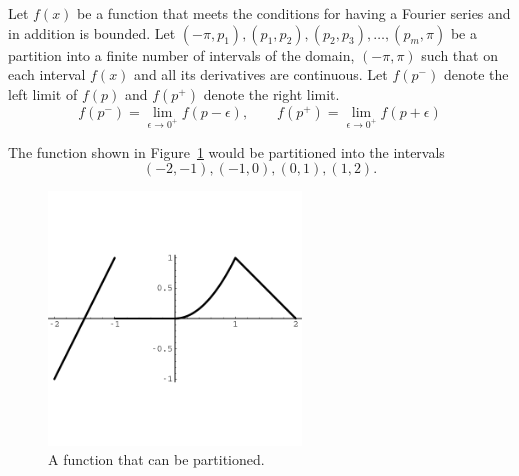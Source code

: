 Let $f(x)$ be a function that meets the conditions for having a Fourier 
series and in addition is bounded.  Let $(-\pi, p_1), (p_1, p_2), (p_2, p_3),
\ldots, (p_m, \pi)$ be a partition into a finite number of intervals of the
domain, $(-\pi, \pi)$ such that on each interval $f(x)$ and all its 
derivatives are continuous.  Let $f(p^-)$ denote the left limit of $f(p)$ and 
$f(p^+)$ denote the right limit.
\[
f(p^-) = \lim_{\epsilon \to 0^+} f(p - \epsilon), \qquad
f(p^+) = \lim_{\epsilon \to 0^+} f(p + \epsilon)
\]


\begin{Example}
  The function shown in Figure~\ref{partition} would be partitioned
  into the intervals 
  \[
  (-2, -1), (-1, 0), (0, 1), (1, 2).
  \]

  \begin{figure}[h!]
    \begin{center}
      \includegraphics[width=0.6\textwidth]{ode/fourier_series/partit}
    \end{center}
    \caption{A function that can be partitioned.}
    \label{partition}
  \end{figure}

\end{Example}





